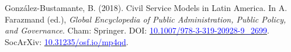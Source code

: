 \begin{publications}
\begin{benumerate}{10}

\item{González-Bustamante, B. (2018). Civil Service Models in Latin America. In A. Farazmand (ed.), {\itshape Global Encyclopedia of Public Administration, Public Policy, and Governance}. Cham: Springer. DOI: \href{https://doi.org/10.1007/978-3-319-20928-9\_2699}{\textcolor{blue}{10.1007/978-3-319-20928-9\_2699}}. SocArXiv: \href{https://doi.org/10.31235/osf.io/mp4qd}{\textcolor{blue}{10.31235/osf.io/mp4qd}}.}\vspace{1mm}


\end{benumerate}

\end{publications}

